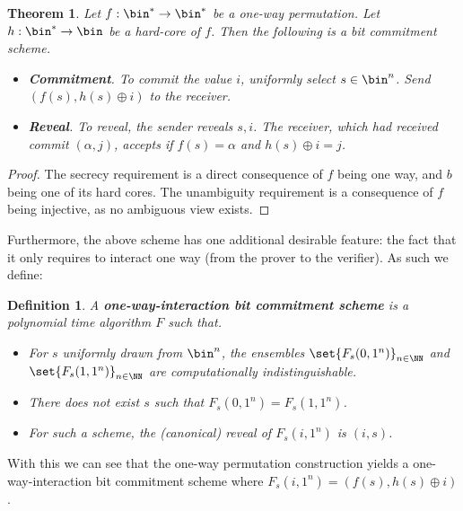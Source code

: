 \documentclass{article}
\newtheorem{theorem}{Theorem}
\newtheorem{definition}{Definition}
\begin{document}
\begin{theorem}
    Let $f: \bin^* \to \bin^*$ be a one-way permutation. Let $h: \bin^* \to \bin$ be a hard-core of $f$. Then the following is a bit commitment scheme.
    \begin{itemize}
        \item \textbf{Commitment}. To commit the value $i$, uniformly select $s \in \bin^n$. Send $(f(s), h(s) \oplus i)$ to the receiver.
        \item \textbf{Reveal}. To reveal, the sender reveals $s, i$. The receiver, which had received commit $(\alpha, j)$, accepts if $f(s) = \alpha$ and $h(s) \oplus i = j$.
    \end{itemize}
\end{theorem}
\begin{proof}
    The secrecy requirement is a direct consequence of $f$ being one way, and $b$ being one of its hard cores.
    The unambiguity requirement is a consequence of $f$ being injective, as no ambiguous view exists.
\end{proof}

Furthermore, the above scheme has one additional desirable feature: the fact that it only requires to interact one way (from the prover to the verifier).
As such we define:
\begin{definition}
    A \textbf{one-way-interaction bit commitment scheme} is a polynomial time algorithm $F$ such that.
    \begin{itemize}
        \item For $s$ uniformly drawn from $\bin^n$, the ensembles $\set{ F_s(0, 1^n) }_{n \in \NN}$ and $\set{ F_s(1, 1^n) }_{n \in \NN}$ are computationally indistinguishable.
        \item There does not exist $s$ such that $F_s(0, 1^n) = F_s(1, 1^n)$.
        \item For such a scheme, the (canonical) reveal of $F_s(i, 1^n)$ is $(i, s)$.
    \end{itemize}
\end{definition}
With this we can see that the one-way permutation construction yields a one-way-interaction bit commitment scheme where $F_s(i, 1^n) = (f(s), h(s) \oplus i)$.
\end{document}
